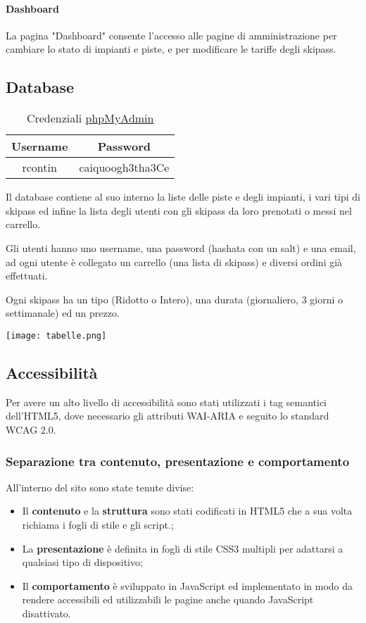 \paragraph{Dashboard}
La pagina "Dashboard" consente l'accesso alle pagine di amministrazione per cambiare lo stato di impianti e piste, e per modificare le tariffe degli skipass.

\pagebreak
\subsection{Database}
\begin{table}[H]
    \centering
    \begin{tabular}{|c|c|}
        \hline
        \rowcolor[HTML]{96FFFB} 
        \textbf{Username} & \textbf{Password} \\ \hline
        rcontin & caiquoogh3tha3Ce \\ \hline
    \end{tabular}
    \caption{Credenziali \href{http://tecweb.studenti.math.unipd.it/phpmyadmin}{phpMyAdmin}}
\end{table}
Il database contiene al suo interno la liste delle piste e degli impianti, i vari tipi di skipass ed infine la lista degli utenti con gli skipass da loro prenotati o messi nel carrello.

Gli utenti hanno uno username, una password (hashata con un salt) e una email, ad ogni utente è collegato un carrello (una lista di skipass) e diversi ordini già effettuati.

Ogni skipass ha un tipo (Ridotto o Intero), una durata (giornaliero, 3 giorni o settimanale) ed un prezzo.


\texttt{[image: tabelle.png]}



\subsection{Accessibilità}
Per avere un alto livello di accessibilità sono stati utilizzati i tag semantici dell'HTML5, dove necessario gli attributi WAI-ARIA e seguito lo standard WCAG 2.0.
\subsubsection{Separazione tra contenuto, presentazione e comportamento}
All'interno del sito sono state tenute divise:
\begin{itemize}
    \item 
        Il \textbf{contenuto} e la \textbf{struttura} sono stati codificati in HTML5 che a sua volta richiama i fogli di stile e gli script.;
    \item 
        La \textbf{presentazione} è definita in fogli di stile CSS3 multipli per adattarsi a qualsiasi tipo di dispositivo;
    \item 
        Il \textbf{comportamento} è sviluppato in JavaScript ed implementato in modo da rendere accessibili ed utilizzabili le pagine anche quando JavaScript disattivato.
\end{itemize}

